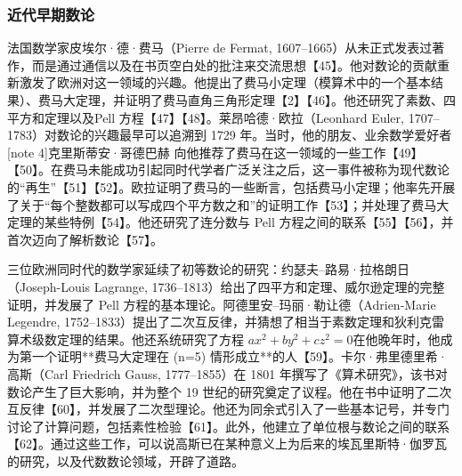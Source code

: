 \subsubsection{近代早期数论}
法国数学家皮埃尔·德·费马（Pierre de Fermat, 1607–1665）从未正式发表过著作，而是通过通信以及在书页空白处的批注来交流思想【45】。他对数论的贡献重新激发了欧洲对这一领域的兴趣。他提出了费马小定理（模算术中的一个基本结果）、费马大定理，并证明了费马直角三角形定理【2】【46】。他还研究了素数、四平方和定理以及Pell 方程【47】【48】。莱昂哈德·欧拉（Leonhard Euler, 1707–1783）对数论的兴趣最早可以追溯到 1729 年。当时，他的朋友、业余数学爱好者[note 4]克里斯蒂安·哥德巴赫 向他推荐了费马在这一领域的一些工作【49】【50】。在费马未能成功引起同时代学者广泛关注之后，这一事件被称为现代数论的“再生”【51】【52】。欧拉证明了费马的一些断言，包括费马小定理；他率先开展了关于“每个整数都可以写成四个平方数之和”的证明工作【53】；并处理了费马大定理的某些特例【54】。他还研究了连分数与 Pell 方程之间的联系【55】【56】，并首次迈向了解析数论【57】。

三位欧洲同时代的数学家延续了初等数论的研究：约瑟夫–路易·拉格朗日（Joseph-Louis Lagrange, 1736–1813）给出了四平方和定理、威尔逊定理的完整证明，并发展了 Pell 方程的基本理论。阿德里安–玛丽·勒让德（Adrien-Marie Legendre, 1752–1833）提出了二次互反律，并猜想了相当于素数定理和狄利克雷算术级数定理的结果。他还系统研究了方程
$ ax^{2} + by^{2} + cz^{2} = 0$在他晚年时，他成为第一个证明**费马大定理在 (n=5) 情形成立**的人【59】。卡尔·弗里德里希·高斯（Carl Friedrich Gauss, 1777–1855）在 1801 年撰写了《算术研究》，该书对数论产生了巨大影响，并为整个 19 世纪的研究奠定了议程。他在书中证明了二次互反律【60】，并发展了二次型理论。他还为同余式引入了一些基本记号，并专门讨论了计算问题，包括素性检验【61】。此外，他建立了单位根与数论之间的联系【62】。通过这些工作，可以说高斯已在某种意义上为后来的埃瓦里斯特·伽罗瓦的研究，以及代数数论领域，开辟了道路。

